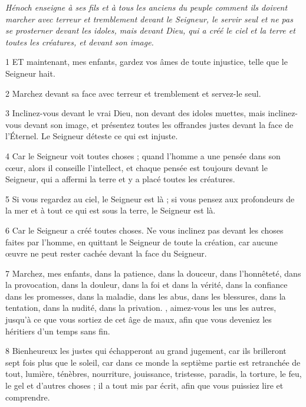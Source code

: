 
\par \textit{Hénoch enseigne à ses fils et à tous les anciens du peuple comment ils doivent marcher avec terreur et tremblement devant le Seigneur, le servir seul et ne pas se prosterner devant les idoles, mais devant Dieu, qui a créé le ciel et la terre et toutes les créatures, et devant son image.}

\par 1 ET maintenant, mes enfants, gardez vos âmes de toute injustice, telle que le Seigneur hait.

\par 2 Marchez devant sa face avec terreur et tremblement et servez-le seul.

\par 3 Inclinez-vous devant le vrai Dieu, non devant des idoles muettes, mais inclinez-vous devant son image, et présentez toutes les offrandes justes devant la face de l'Éternel. Le Seigneur déteste ce qui est injuste.

\par 4 Car le Seigneur voit toutes choses ; quand l'homme a une pensée dans son cœur, alors il conseille l'intellect, et chaque pensée est toujours devant le Seigneur, qui a affermi la terre et y a placé toutes les créatures.

\par 5 Si vous regardez au ciel, le Seigneur est là ; si vous pensez aux profondeurs de la mer et à tout ce qui est sous la terre, le Seigneur est là.

\par 6 Car le Seigneur a créé toutes choses. Ne vous inclinez pas devant les choses faites par l'homme, en quittant le Seigneur de toute la création, car aucune œuvre ne peut rester cachée devant la face du Seigneur.

\par 7 Marchez, mes enfants, dans la patience, dans la douceur, dans l'honnêteté, dans la provocation, dans la douleur, dans la foi et dans la vérité, dans la confiance dans les promesses, dans la maladie, dans les abus, dans les blessures, dans la tentation, dans la nudité, dans la privation. , aimez-vous les uns les autres, jusqu'à ce que vous sortiez de cet âge de maux, afin que vous deveniez les héritiers d'un temps sans fin.

\par 8 Bienheureux les justes qui échapperont au grand jugement, car ils brilleront sept fois plus que le soleil, car dans ce monde la septième partie est retranchée de tout, lumière, ténèbres, nourriture, jouissance, tristesse, paradis, la torture, le feu, le gel et d'autres choses ; il a tout mis par écrit, afin que vous puissiez lire et comprendre.

